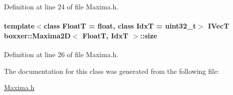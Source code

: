 Definition at line 24 of file Maxima.\+h.

\paragraph[{\texorpdfstring{size}{size}}]{\setlength{\rightskip}{0pt plus 5cm}template$<$class FloatT  = float, class IdxT  = uint32\+\_\+t$>$ {\bf I\+VecT} {\bf boxxer\+::\+Maxima2D}$<$ FloatT, IdxT $>$\+::size}\hypertarget{classboxxer_1_1Maxima2D_aa05d0c7a4c0e6ed2b2b918986d53d069}{}\label{classboxxer_1_1Maxima2D_aa05d0c7a4c0e6ed2b2b918986d53d069}


Definition at line 26 of file Maxima.\+h.



The documentation for this class was generated from the following file\+:\begin{DoxyCompactItemize}
\item 
\hyperlink{Maxima_8h}{Maxima.\+h}\end{DoxyCompactItemize}
